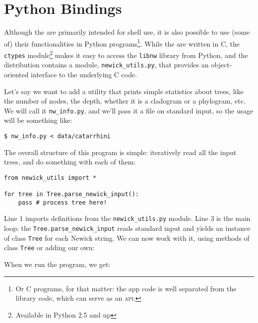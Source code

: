 
\chapter{Python Bindings}
\label{chap_python_lib}

Although the \nutils{} are primarily intended for shell use, it is also
possible to use (some of) their functionalities in Python programs\footnote{Or
C programs, for that matter: the app code is well separated from the library
code, which can serve as an \textsc{api}.}. While the \nutils{} are written in
C, the \texttt{ctypes} module\footnote{Available in Python 2.5 and up} makes it
easy to access the \texttt{libnw} library from Python, and the distribution
contains a module, \texttt{newick\_utils.py}, that provides an object-oriented
interface to the underlying C code.

Let's say we want to add a utility that prints simple statistics about trees,
like the number of nodes, the depth, whether it is a cladogram or a phylogram,
etc. We will call it \texttt{nw\_info.py}, and we'll pass it a \nw{}
file on standard input, so the usage will be something like:

\begin{verbatim}
$ nw_info.py < data/catarrhini
\end{verbatim}

\noindent{}The overall structure of this program is simple: iteratively read
all the input trees, and do something with each of them:

\begin{lstlisting}
from newick_utils import *

for tree in Tree.parse_newick_input():
    pass # process tree here!
\end{lstlisting}

\noindent{}Line 1 imports definitions from the \texttt{newick\_utils.py}
module. Line 3 is the main loop: the \texttt{Tree.parse\_newick\_input}
reads standard input and yields an instance of class \texttt{Tree} for each
Newick string. We can now work with it, using methods of class \texttt{Tree} or adding our own:



\noindent{}When we run the program, we get:

